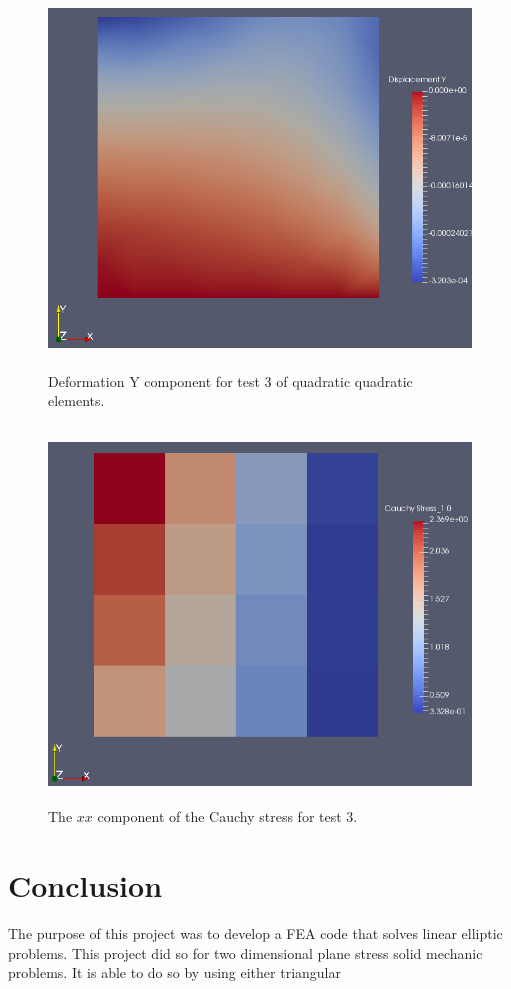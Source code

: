 \documentclass[a4paper, 12pt]{article}
\begin{document}
\begin{figure}[H]
  \centering
  \includegraphics[width=13cm, height=10cm]{Qquad_4_t3_disp_Y}
  \caption{Deformation Y component for test 3 of quadratic
            quadratic elements.}
  \label{fig:quadQuad3_y}
\end{figure}

\begin{figure}[H]
  \centering
  \includegraphics[width=13cm, height=10cm]{Qquad_4_t3_Sxx}
  \caption{The $xx$ component of the Cauchy stress for test 3.}
  \label{fig:quadQuad3_SXX}
\end{figure}

\section{Conclusion} \label{sec:conclusion}
The purpose of this project was to develop a FEA code that 
solves linear elliptic problems. This project did so for
two dimensional plane stress solid mechanic problems. 
It is able to do so by using either triangular 
\end{document}
